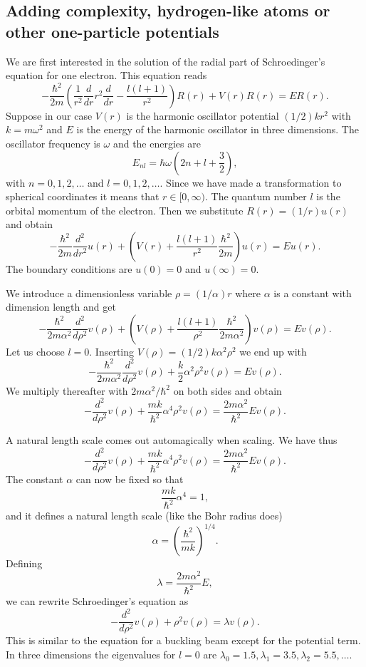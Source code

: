 \subsection{Adding complexity, hydrogen-like atoms or other one-particle potentials}

We are first interested in the solution of the radial part of Schroedinger's equation for one electron. This equation reads
\[
  -\frac{\hbar^2}{2 m} \left ( \frac{1}{r^2} \frac{d}{dr} r^2
  \frac{d}{dr} - \frac{l (l + 1)}{r^2} \right )R(r)
     + V(r) R(r) = E R(r).
\]
Suppose in our  case $V(r)$ is the harmonic oscillator potential $(1/2)kr^2$ with
$k=m\omega^2$ and $E$ is
the energy of the harmonic oscillator in three dimensions.
The oscillator frequency is $\omega$ and the energies are
\[
E_{nl}=  \hbar \omega \left(2n+l+\frac{3}{2}\right),
\]
with $n=0,1,2,\dots$ and $l=0,1,2,\dots$.
Since we have made a transformation to spherical coordinates it means that
$r\in [0,\infty)$.
The quantum number
$l$ is the orbital momentum of the electron.   Then we substitute $R(r) = (1/r) u(r)$ and obtain
\[
  -\frac{\hbar^2}{2 m} \frac{d^2}{dr^2} u(r)
       + \left ( V(r) + \frac{l (l + 1)}{r^2}\frac{\hbar^2}{2 m}
                                    \right ) u(r)  = E u(r) .
\]
The boundary conditions are $u(0)=0$ and $u(\infty)=0$.

We introduce a dimensionless variable $\rho = (1/\alpha) r$
where $\alpha$ is a constant with dimension length and get
\[
  -\frac{\hbar^2}{2 m \alpha^2} \frac{d^2}{d\rho^2} v(\rho)
       + \left ( V(\rho) + \frac{l (l + 1)}{\rho^2}
         \frac{\hbar^2}{2 m\alpha^2} \right ) v(\rho)  = E v(\rho) .
\]
Let us choose $l=0$.
Inserting $V(\rho) = (1/2) k \alpha^2\rho^2$ we end up with
\[
  -\frac{\hbar^2}{2 m \alpha^2} \frac{d^2}{d\rho^2} v(\rho)
       + \frac{k}{2} \alpha^2\rho^2v(\rho)  = E v(\rho) .
\]
We multiply thereafter with $2m\alpha^2/\hbar^2$ on both sides and obtain
\[
  -\frac{d^2}{d\rho^2} v(\rho)
       + \frac{mk}{\hbar^2} \alpha^4\rho^2v(\rho)  = \frac{2m\alpha^2}{\hbar^2}E v(\rho) .
\]

A natural length scale comes out automagically when scaling. We have thus
\[
  -\frac{d^2}{d\rho^2} v(\rho)
       + \frac{mk}{\hbar^2} \alpha^4\rho^2v(\rho)  = \frac{2m\alpha^2}{\hbar^2}E v(\rho) .
\]
The constant $\alpha$ can now be fixed
so that
\[
\frac{mk}{\hbar^2} \alpha^4 = 1,
\]
and it defines a natural length scale (like the Bohr radius does)
\[
\alpha = \left(\frac{\hbar^2}{mk}\right)^{1/4}.
\]
Defining
\[
\lambda = \frac{2m\alpha^2}{\hbar^2}E,
\]
we can rewrite Schroedinger's equation as
\[
  -\frac{d^2}{d\rho^2} v(\rho) + \rho^2v(\rho)  = \lambda v(\rho) .
\]
This is similar to the equation for a buckling beam except for the potential term.
In three dimensions
the eigenvalues for $l=0$ are
$\lambda_0=1.5,\lambda_1=3.5,\lambda_2=5.5,\dots .$

